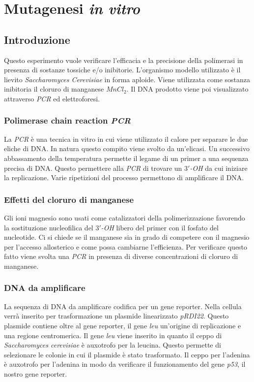 \section*{Mutagenesi \emph{in vitro}}

	\subsection*{Introduzione}
        Questo esperimento vuole verificare l'efficacia e la precisione della polimerasi in presenza di sostanze tossiche e/o inibitorie.
	L'organismo modello utilizzato è il lievito \emph{Saccharomyces Cerevisiae} in forma aploide.
	Viene utilizzata come sostanza inibitoria il cloruro di manganese \emph{$MnCl_2$}.
	Il DNA prodotto viene poi visualizzato attraverso \emph{PCR} ed elettroforesi.
        
		\subsubsection*{Polimerase chain reaction \emph{PCR}}
		La \emph{PCR} \`e una tecnica in vitro in cui viene utilizzato il calore per separare le due eliche di DNA.
		In natura questo compito viene svolto da un'elicasi.
       		Un successivo abbassamento della temperatura permette il legame di un primer a una sequenza precisa di DNA.
		Questo permettere alla \emph{PCR} di trovare un \emph{$3'$-OH} da cui iniziare la replicazione.
		Varie ripetizioni del processo permettono di amplificare il DNA.

		\subsubsection*{Effetti del cloruro di manganese}
		Gli ioni magnesio sono usati come catalizzatori della polimerizzazione favorendo la sostituzione nucleofilica del \emph{$3'$-OH} libero del primer con il fosfato del nucleotide.
		Ci si chiede se il manganese sia in grado di competere con il magnesio per l'accesso allosterico e come possa cambiarne l'efficienza.
		Per verificare questo fatto viene svolta una \emph{PCR} in presenza di diverse concentrazioni di cloruro di manganese.

		\subsubsection*{DNA da amplificare}
        	La sequenza di DNA da amplificare codifica per un gene reporter.
		Nella cellula verrà inserito per trasformazione un plasmide linearizzato \emph{pRDI22}.
		Questo plasmide contiene oltre al gene reporter, il gene \emph{leu} un'origine di replicazione e una regione centromerica.
		Il gene \emph{leu} viene inserito in quanto il ceppo di \emph{Saccharomyces cerevisiae} \`e auxotrofo per la leucina.
		Questo permette di selezionare le colonie in cui il plasmide \`e stato trasformato.
		Il ceppo per l'adenina \`e auxotrofo per l'adenina in modo da verificare il funzionamento del gene \emph{p53}, il nostro gene reporter.


